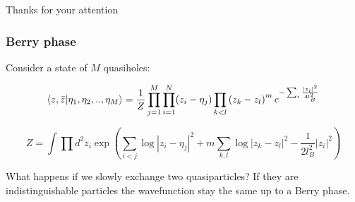 \documentclass{beamer}
\begin{document}

\begin{frame}
\begin{center}

\Large{Thanks for your attention}

\end{center}
\end{frame}

\begin{frame}
\frametitle{Berry phase}
\begin{center}

Consider a state of $M$ quasiholes:

\[
\braket{z, \bar{z} | \eta_1, \eta_2, .., \eta_M} = \frac{1}{Z}\prod_{j = 1}^{M} \prod_{i = 1}^{N} ( z_i - \eta_j ) \prod_{k < l} \left( z_k - z_l \right)^{m} e^{- \sum_{i} \frac{|z_i|^2}{4 l_B^2}}
\]

\[
Z = \int \prod d^2 z_i \exp \left( \sum_{i < j} \log | z_i - \eta_j|^2 + m \sum_{k, l} \log |z_k - z_l|^2 - \frac{1}{2 l_B^2} |z_i|^2 \right)
\]

What happens if we slowly exchange two quasiparticles? If they are indistinguishable particles the wavefunction stay the same up to a Berry phase.

\end{center}
\end{frame}
\end{document}
